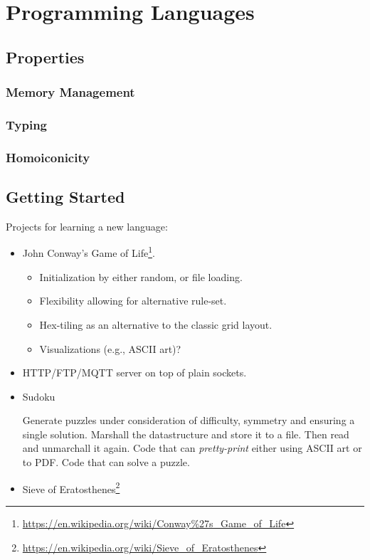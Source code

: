 \chapter{Programming Languages}

\section{Properties}

\subsection{Memory Management}

\subsection{Typing}

\subsection{Homoiconicity}

\section{Getting Started}

Projects for learning a new language:
\begin{itemize}
  \item John Conway's Game of Life\footnote{\url{https://en.wikipedia.org/wiki/Conway\%27s_Game_of_Life}}\cite{Gardener1970MathematicalGT}.
    \begin{itemize}
      \item Initialization by either random, or file loading.
      \item Flexibility allowing for alternative rule-set.
      \item Hex-tiling as an alternative to the classic grid layout.
      \item Visualizations (e.g., ASCII art)?
    \end{itemize}
  \item HTTP/FTP/MQTT server on top of plain sockets.
  \item Sudoku
    \begin{itemize}
       Generate puzzles under consideration of difficulty, symmetry and ensuring a single solution.
       Marshall the datastructure and store it to a file. Then read and unmarchall it again.
       Code that can \textsl{pretty-print} either using ASCII art or to PDF.
       Code that can solve a puzzle.
    \end{itemize}
  \item Sieve of Eratosthenes\footnote{\url{https://en.wikipedia.org/wiki/Sieve_of_Eratosthenes}}
\end{itemize}










